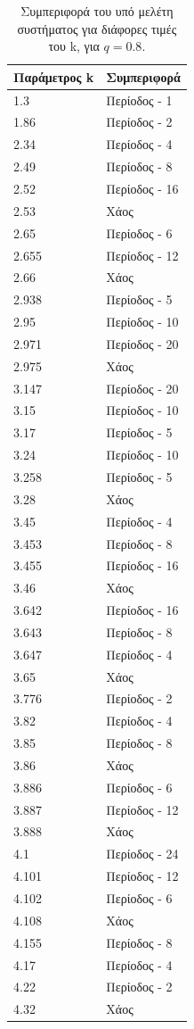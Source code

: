 \begin{table}[ht]
	\centering
	\caption{ Συμπεριφορά του υπό μελέτη συστήματος για διάφορες τιμές του k, για $q=0.8$. }
	\label{tab:abc12}
	\begin{tabular}{l | l}
		Παράμετρος k & Συμπεριφορά \\
		\hline
		1.3 &  Περίοδος -  1 \\
		1.86 &  Περίοδος -  2 \\
		2.34& Περίοδος -  4 \\
		2.49& Περίοδος -  8 \\
		2.52& Περίοδος -  16 \\
		2.53 & Xάος \\
		2.65& Περίοδος - 6 \\
		2.655& Περίοδος - 12\\
		2.66& Χάος \\
		2.938& Περίοδος - 5 \\
		2.95 &  Περίοδος - 10  \\
		2.971 &  Περίοδος -  20 \\
		2.975 &  Χάος \\
		3.147& Περίοδος - 20 \\
		3.15 &  Περίοδος - 10  \\
		3.17 &  Περίοδος -  5 \\
		3.24 &Περίοδος - 10 \\
		3.258 &  Περίοδος -  5\\
		3.28 &Χάος \\
		3.45 & Περίοδος - 4\\
		3.453& Περίοδος - 8\\
		3.455& Περίοδος - 16\\
		3.46& Xάος\\
		3.642& Περίοδος - 16\\
		3.643 & Περίοδος - 8\\
		3.647& Περίοδος - 4\\
		3.65 & Χάος\\
		3.776 & Περίοδος -  2\\
		3.82 & Περίοδος -  4\\
		3.85 & Περίοδος -  8\\
		3.86 & Xάος\\
		3.886 & Περίοδος -  6\\
		3.887 & Περίοδος -  12\\
		3.888 & Χάος\\
		4.1& Περίοδος -  24\\
		4.101& Περίοδος -  12\\
		4.102 & Περίοδος -  6\\
		4.108 & Χάος\\
		4.155 & Περίοδος -  8\\
		4.17 & Περίοδος -  4\\
		4.22 & Περίοδος -  2\\
		4.32 &  Χάος\\
		
	\end{tabular}
	
\end{table}

